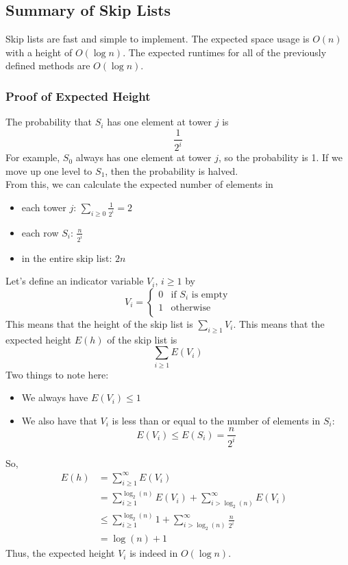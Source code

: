 \documentclass{report}
\begin{document}
\subsection{Summary of Skip Lists}
Skip lists are fast and simple to implement. The expected space usage is $O(n)$ with a height of $O(\log n)$. The expected runtimes for all of the previously defined methods are $O(\log n)$.
\subsubsection{Proof of Expected Height}
The probability that $S_i$ has one element at tower $j$ is $$\frac{1}{2^i}$$
For example, $S_0$ always has one element at tower $j$, so the probability is 1. If we move up one level to $S_1$, then the probability is halved.\\ 
From this, we can calculate the expected number of elements in
\begin{itemize}
\item each tower $j$: $\displaystyle \sum_{i \geq 0} \frac{1}{2^i} = 2$
\item each row $S_i$: $\displaystyle \frac{n}{2^i}$
\item in the entire skip list: $2n$
\end{itemize}
Let's define an indicator variable $V_i$, $i \geq 1$ by
$$V_i = 
     \begin{cases}
      0 & \text{if } S_i \text{ is empty} \\
      1 & \text{otherwise} \\ 
     \end{cases} $$
This means that the height of the skip list is $\displaystyle \sum_{i \geq 1} V_i$. This means that the expected height $E(h)$ of the skip list is $$\sum_{i\geq 1} E(V_i)$$
Two things to note here:
\begin{itemize}
\item We always have $E(V_i) \leq 1$
\item We also have that $V_i$ is less than or equal to the number of elements in $S_i$: $$E(V_i) \leq E(S_i) = \frac{n}{2^i}$$
\end{itemize}
So, 
\begin{align*}
E(h) &= \sum_{i \geq 1}^\infty E(V_i) \\
&= \sum_{i \geq 1}^{\log_2 (n)}E(V_i) + \sum_{i > \log_2(n)}^\infty E(V_i) \\
&\leq \sum_{i \geq 1}^{\log_2 (n)} 1 + \sum_{i > \log_2(n)}^\infty \frac{n}{2^i} \\
&= \log (n) + 1 & \text{}
\end{align*}
Thus, the expected height $V_i$ is indeed in $O(\log n)$.
\end{document}
